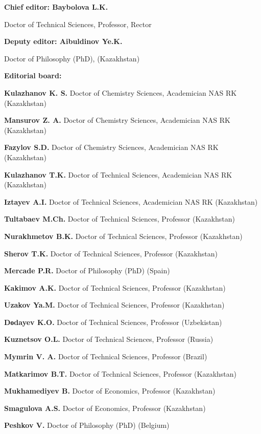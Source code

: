 {\small
\begin{center}
\textbf{Chief editor: Baybolova L.K.}

Doctor of Technical Sciences, Professor, Rector

\textbf{Deputy editor: Aibuldinov Ye.K.}

Doctor of Philosophy (PhD), (Kazakhstan)

\textbf{Editorial board:}
\end{center}

\textbf{Kulazhanov K. S.} Doctor of Chemistry Sciences, Academician NAS RK (Kazakhstan)

\textbf{Mansurov Z. A.} Doctor of Chemistry Sciences, Academician NAS RK (Kazakhstan)

\textbf{Fazylov S.D.} Doctor of Chemistry Sciences, Academician NAS RK (Kazakhstan)

\textbf{Kulazhanov T.K.} Doctor of Technical Sciences, Academician NAS RK (Kazakhstan)

\textbf{Iztayev A.I.} Doctor of Technical Sciences, Academician NAS RK (Kazakhstan)

\textbf{Tultabaev M.Ch.} Doctor of Technical Sciences, Professor (Kazakhstan)

\textbf{Nurakhmetov B.K.} Doctor of Technical Sciences, Professor (Kazakhstan)

\textbf{Sherov T.K.} Doctor of Technical Sciences, Professor (Kazakhstan)

\textbf{Mercade P.R.} Doctor of Philosophy (PhD) (Spain)

\textbf{Kakimov A.K.} Doctor of Technical Sciences, Professor (Kazakhstan)

\textbf{Uzakov Ya.M.} Doctor of Technical Sciences, Professor (Kazakhstan)

\textbf{Dоdayev K.O.} Doctor of Technical Sciences, Professor (Uzbekistan)

\textbf{Kuznetsov O.L.} Doctor of Technical Sciences, Professor (Russia)

\textbf{Mymrin V. A.} Doctor of Technical Sciences, Professor (Brazil)

\textbf{Matkarimov B.T.} Doctor of Technical Sciences, Professor (Kazakhstan)

\textbf{Mukhamediyev B.} Doctor of Economics, Professor (Kazakhstan)

\textbf{Smagulova A.S.} Doctor of Economics, Professor (Kazakhstan)

\textbf{Peshkov V.} Doctor of Philosophy (PhD) (Belgium)

}
